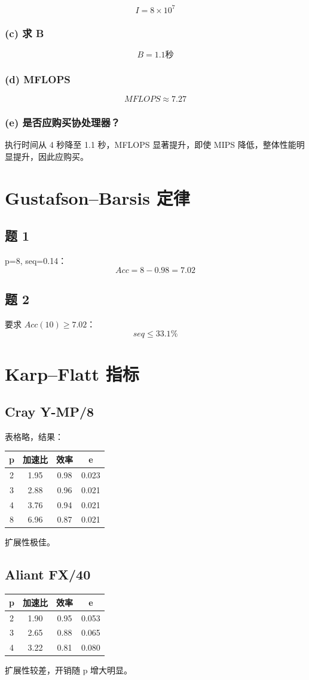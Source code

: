 \documentclass[12pt]{article}
\begin{document}
\[
I=8\times10^7
\]

\subsubsection*{(c) 求 B}
\[
B=1.1\text{秒}
\]

\subsubsection*{(d) MFLOPS}
\[
MFLOPS \approx 7.27
\]

\subsubsection*{(e) 是否应购买协处理器？}
执行时间从 4 秒降至 1.1 秒，MFLOPS 显著提升，即使 MIPS 降低，整体性能明显提升，因此应购买。


\section{Gustafson--Barsis 定律}

\subsection{题 1}
p=8, seq=0.14：
\[
Acc=8 - 0.98 = 7.02
\]

\subsection{题 2}
要求 $Acc(10)\ge 7.02$：
\[
seq \le 33.1\%
\]


\section{Karp--Flatt 指标}

\subsection{Cray Y-MP/8}
表格略，结果：

\begin{center}
\begin{tabular}{c|c|c|c}
p & 加速比 & 效率 & e \\ \hline
2 & 1.95 & 0.98 & 0.023 \\
3 & 2.88 & 0.96 & 0.021 \\
4 & 3.76 & 0.94 & 0.021 \\
8 & 6.96 & 0.87 & 0.021 \\
\end{tabular}
\end{center}

扩展性极佳。

\subsection{Aliant FX/40}

\begin{center}
\begin{tabular}{c|c|c|c}
p & 加速比 & 效率 & e \\ \hline
2 & 1.90 & 0.95 & 0.053 \\
3 & 2.65 & 0.88 & 0.065 \\
4 & 3.22 & 0.81 & 0.080 \\
\end{tabular}
\end{center}

扩展性较差，开销随 p 增大明显。
\end{document}
